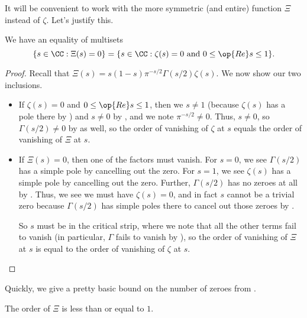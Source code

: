 \documentclass[../notes.tex]{subfiles}
\begin{document}
It will be convenient to work with the more symmetric (and entire) function $\Xi$ instead of $\zeta$. Let's justify this.
\begin{lemma}
	We have an equality of multisets
	\[\{s\in\CC:\Xi(s)=0\}=\{s\in\CC:\zeta(s)=0\text{ and }0\le\op{Re}s\le1\}.\]
\end{lemma}
\begin{proof}
	Recall that $\Xi(s)=s(1-s)\pi^{-s/2}\Gamma(s/2)\zeta(s)$. We now show our two inclusions.
	\begin{itemize}
		\item If $\zeta(s)=0$ and $0\le\op{Re}s\le1$, then we $s\ne1$ (because $\zeta(s)$ has a pole there by ) and $s\ne0$ by , and we note $\pi^{-s/2}\ne0$. Thus, $s\ne0$, so $\Gamma(s/2)\ne0$ by  as well, so the order of vanishing of $\zeta$ at $s$ equals the order of vanishing of $\Xi$ at $s$.
		\item If $\Xi(s)=0$, then one of the factors must vanish. For $s=0$, we see $\Gamma(s/2)$ has a simple pole by  cancelling out the zero. For $s=1$, we see $\zeta(s)$ has a simple pole by  cancelling out the zero. Further, $\Gamma(s/2)$ has no zeroes at all by . Thus, we see we must have $\zeta(s)=0$, and in fact $s$ cannot be a trivial zero because $\Gamma(s/2)$ has simple poles there to cancel out those zeroes by .
		
		So $s$ must be in the critical strip, where we note that all the other terms fail to vanish (in particular, $\Gamma$ fails to vanish by ), so the order of vanishing of $\Xi$ at $s$ is equal to the order of vanishing of $\zeta$ at $s$.
		\qedhere
	\end{itemize}
\end{proof}
Quickly, we give a pretty basic bound on the number of zeroes from .
\begin{lemma}
	The order of $\Xi$ is less than or equal to $1$.
\end{lemma}
\end{document}
